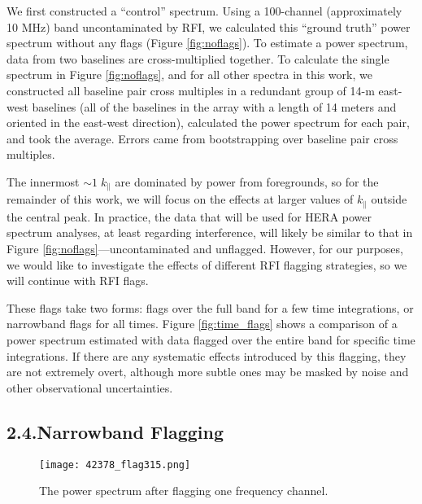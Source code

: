 \documentclass[12pt]{article}
\begin{document}
We first constructed a ``control'' spectrum. Using a 100-channel (approximately 10 MHz) band uncontaminated by RFI, we calculated this ``ground truth'' power spectrum without any flags (Figure \ref{fig:noflags}). To estimate a power spectrum, data from two baselines are cross-multiplied together. To calculate the single spectrum in Figure \ref{fig:noflags}, and for all other spectra in this work, we constructed all baseline pair cross multiples in a redundant group of 14-m east-west baselines (all of the baselines in the array with a length of 14 meters and oriented in the east-west direction), calculated the power spectrum for each pair, and took the average. Errors came from bootstrapping over baseline pair cross multiples.

The innermost $\sim 1 \; k_\parallel$ are dominated by power from foregrounds, so for the remainder of this work, we will focus on the effects at larger values of $k_\parallel$ outside the central peak. In practice, the data that will be used for HERA power spectrum analyses, at least regarding interference, will likely be similar to that in Figure \ref{fig:noflags}---uncontaminated and unflagged. However, for our purposes, we would like to investigate the effects of different RFI flagging strategies, so we will continue with RFI flags.

These flags take two forms: flags over the full band for a few time integrations, or narrowband flags for all times. Figure \ref{fig:time_flags} shows a comparison of a power spectrum estimated with data flagged over the entire band for specific time integrations. If there are any systematic effects introduced by this flagging, they are not extremely overt, although more subtle ones may be masked by noise and other observational uncertainties. \vspace{3mm}

\tocless\subsection{\hypertarget{subsec:narrowband}{2.4.\hspace{0.75em}Narrowband Flagging}}

\begin{figure}[p]
	\centering
	\texttt{[image: 42378\_flag315.png]}
	\caption[Power spectrum calculated with flagged time integrations and one flagged channel]{The power spectrum after flagging one frequency channel.}
	\label{fig:flag_chan315}
\end{figure}
\end{document}
